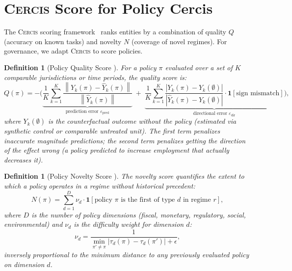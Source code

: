 \documentclass[11pt,a4paper]{article}
\newtheorem{definition}[theorem]{Definition}
\theoremstyle{definition}
\newcommand{\Cercis}{\textsc{Cercis}}
\newcommand{\ind}[1]{\mathbf{1}[#1]}
\newcommand{\norm}[1]{\left\lVert#1\right\rVert}
\newcommand{\abs}[1]{\left|#1\right|}
\begin{document}
\section{\Cercis{} Score for Policy Cercis}
\label{sec:cercis}
The \Cercis{} scoring framework~\cite{SCX2025} ranks entities by a combination of quality $Q$ (accuracy on known tasks) and novelty $N$ (coverage of novel regimes). For governance, we adapt \Cercis{} to score policies.
\begin{definition}[Policy Quality Score ]
\label{def:policy_Q}
For a policy $\pi$ evaluated over a set of $K$ comparable jurisdictions or time periods, the quality score is:
\begin{equation}
    Q(\pi) = -\Bigg(
        \underbrace{\frac{1}{K}\sum_{k=1}^{K} \frac{\norm{Y_k(\pi) - \hat{Y}_k(\pi)}}{\norm{\hat{Y}_k(\pi)}}}_{\text{prediction error } \varepsilon_{\mathrm{pred}}}
        \;+\;
        \underbrace{\frac{1}{K}\sum_{k=1}^{K} \frac{\abs{Y_k(\pi) - Y_k(\emptyset)}}{\abs{\hat{Y}_k(\pi) - Y_k(\emptyset)}} \cdot \ind{\text{sign mismatch}}}_{\text{directional error } \varepsilon_{\mathrm{dir}}}
    \Bigg),
    \label{eq:policy_Q}
\end{equation}
where $Y_k(\emptyset)$ is the counterfactual outcome without the policy (estimated via synthetic control or comparable untreated unit). The first term penalizes inaccurate magnitude predictions; the second term penalizes getting the \textit{direction} of the effect wrong (a policy predicted to increase employment that actually decreases it).
\end{definition}
\begin{definition}[Policy Novelty Score ]
\label{def:policy_N}
The novelty score quantifies the extent to which a policy operates in a regime without historical precedent:
\begin{equation}
    N(\pi) = \sum_{d=1}^{D} \nu_d \cdot \ind{\text{policy $\pi$ is the first of type $d$ in regime $r$}},
    \label{eq:policy_N}
\end{equation}
where $D$ is the number of policy dimensions (fiscal, monetary, regulatory, social, environmental) and $\nu_d$ is the difficulty weight for dimension $d$:
\begin{equation}
    \nu_d = \frac{1}{\min_{\pi' \neq \pi} \abs{\tau_d(\pi) - \tau_d(\pi')} + \epsilon},
    \label{eq:nu_d}
\end{equation}
inversely proportional to the minimum distance to any previously evaluated policy on dimension $d$.
\end{definition}
\end{document}
